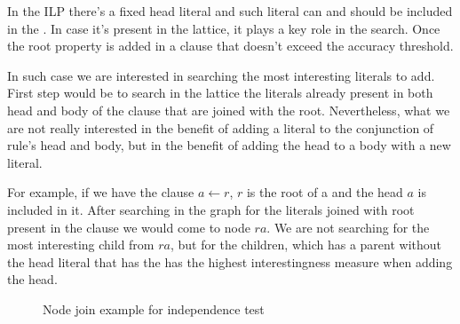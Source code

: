 In the ILP there's a fixed head literal and such literal can and should be included in the \graphname. In case it's
present in the lattice, it plays a key role in the search. Once the root property is added in a clause that doesn't
exceed the accuracy threshold.

In such case we are interested in searching the most interesting literals to add. First step would be to search in the
lattice the literals already present in both head and body of the clause that are joined with the root. Nevertheless,
what we are not really interested in the benefit of adding a literal to the conjunction of rule's head and body, but in
the benefit of adding the head to a body with a new literal.

For example, if we have the clause $a \leftarrow r$, $r$ is the root of a \graphname and the head $a$ is included in it.
After searching in the graph for the literals joined with root present in the clause we would come to node
$ra$. We are not searching for the most interesting child from $ra$, but for the children, which has a parent without
the head literal that has the has the highest interestingness measure when adding the head.

\begin{figure}[!h]
  \caption{Node join example for independence test}
  \centering
  \label{fig:latticeSuggestion}
\end{figure}

